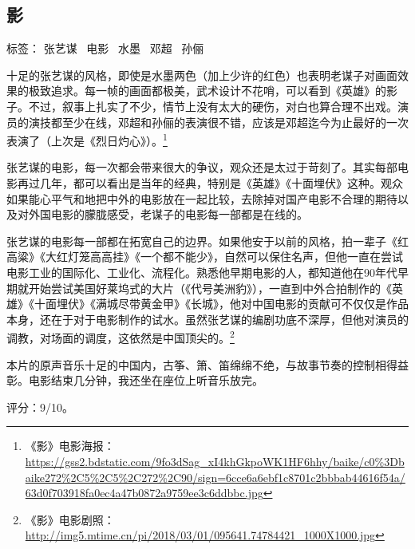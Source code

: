 \subsection{影}

标签： 张艺谋 \  电影 \  水墨 \ 邓超 \  孙俪

十足的张艺谋的风格，即使是水墨两色（加上少许的红色）也表明老谋子对画面效果的极致追求。每一帧的画面都极美，武术设计不花哨，可以看到《英雄》的影子。不过，叙事上扎实了不少，情节上没有太大的硬伤，对白也算合理不出戏。演员的演技都至少在线，邓超和孙俪的表演很不错，应该是邓超迄今为止最好的一次表演了（上次是《烈日灼心》）。\footnote{《影》电影海报：\url{https://gss2.bdstatic.com/9fo3dSag_xI4khGkpoWK1HF6hhy/baike/c0\%3Dbaike272\%2C5\%2C5\%2C272\%2C90/sign=6cce6a6ebf1c8701c2bbbab44616f54a/63d0f703918fa0ec4a47b0872a9759ee3c6ddbbc.jpg}}

张艺谋的电影，每一次都会带来很大的争议，观众还是太过于苛刻了。其实每部电影再过几年，都可以看出是当年的经典，特别是《英雄》《十面埋伏》这种。观众如果能心平气和地把中外的电影放在一起比较，去除掉对国产电影不合理的期待以及对外国电影的朦胧感受，老谋子的电影每一部都是在线的。

张艺谋的电影每一部都在拓宽自己的边界。如果他安于以前的风格，拍一辈子《红高粱》《大红灯笼高高挂》《一个都不能少》，自然可以保住名声，但他一直在尝试电影工业的国际化、工业化、流程化。熟悉他早期电影的人，都知道他在90年代早期就开始尝试美国好莱坞式的大片（《代号美洲豹》），一直到中外合拍制作的《英雄》《十面埋伏》《满城尽带黄金甲》《长城》，他对中国电影的贡献可不仅仅是作品本身，还在于对于电影制作的试水。虽然张艺谋的编剧功底不深厚，但他对演员的调教，对场面的调度，这依然是中国顶尖的。\footnote{《影》电影剧照：\url{http://img5.mtime.cn/pi/2018/03/01/095641.74784421_1000X1000.jpg}}

本片的原声音乐十足的中国内，古筝、箫、笛绵绵不绝，与故事节奏的控制相得益彰。电影结束几分钟，我还坐在座位上听音乐放完。

评分：9/10。


